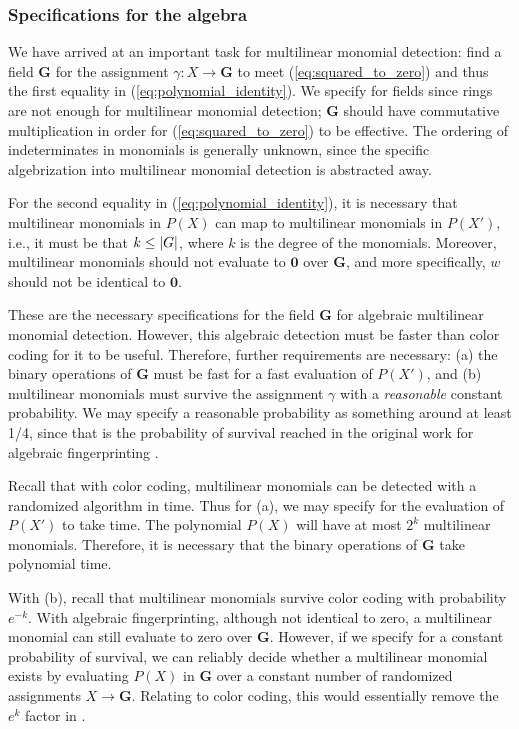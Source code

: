 \subsubsection{Specifications for the algebra}

We have arrived at an important task for multilinear monomial detection: 
find a field $\mathbf{G}$ for 
the assignment $\gamma \colon X \to \mathbf{G}$ to meet 
(\ref{eq:squared_to_zero}) and thus the first equality in (\ref{eq:polynomial_identity}). 
We specify for fields since rings are not enough for multilinear monomial detection; 
$\mathbf{G}$ should have commutative multiplication in order for (\ref{eq:squared_to_zero}) 
to be effective. The ordering of indeterminates in monomials is generally unknown, 
since the specific algebrization into multilinear monomial detection 
is abstracted away. %

For the second equality in (\ref{eq:polynomial_identity}), it is necessary that multilinear 
monomials in $P(X)$ can map to multilinear monomials in $P(X')$, i.e., it must be that 
$k \leq {\left\vert G\right\vert}$, where $k$ is the degree of the monomials. 
Moreover, multilinear monomials 
should not evaluate to $\mathbf{0}$ over $\mathbf{G}$, and more specifically, 
$w$ should not be identical to $\mathbf{0}$.

These are the necessary specifications for the field $\mathbf{G}$ for algebraic multilinear monomial detection. 
However, this algebraic detection must be faster than color coding for it to be useful. 
Therefore, further requirements are necessary: (a) the binary operations of $\mathbf{G}$ 
must be fast for a fast evaluation of $P(X')$, and (b) multilinear monomials must 
survive the assignment $\gamma$ with a \emph{reasonable} constant probability. 
We may specify a reasonable probability as something around at least 1/4, since that is 
the probability of survival reached in the original work for algebraic fingerprinting \cite{Koutis08}.

Recall that with color coding, multilinear monomials can be detected with a 
randomized algorithm in  time. Thus for (a), we may specify for 
the evaluation of $P(X')$ to take  time. The polynomial $P(X)$ 
will have at most $2^k$ multilinear monomials. Therefore, 
it is necessary that the binary operations 
of $\mathbf{G}$ take polynomial time.

With (b), recall that multilinear monomials 
survive color coding with probability $e^{-k}$. 
With algebraic fingerprinting, although not identical to zero, a multilinear monomial 
can still evaluate to zero over $\mathbf{G}$. 
However, if we specify for a constant 
probability of survival, we can reliably decide whether a multilinear monomial exists 
by evaluating $P(X)$ in $\mathbf{G}$ over a constant number of 
randomized assignments $X \to \mathbf{G}$. Relating to color coding, 
this would essentially remove the 
$e^k$ factor in .

